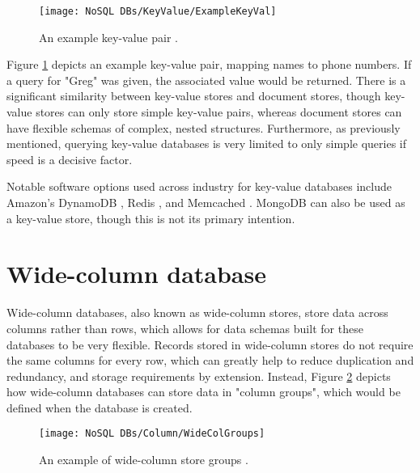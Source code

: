 
\begin{figure}[H]
    \centering
    \texttt{[image: NoSQL DBs/KeyValue/ExampleKeyVal]}
    \caption{An example key-value pair \autocite{redisWhatKeyValueDatabase}.\label{fig:ExampleKeyVal}}
\end{figure}


\noindent Figure \ref{fig:ExampleKeyVal} depicts an example key-value pair, mapping names to phone numbers. If a query for "Greg" was given, 
the associated value would be returned. There is a significant similarity between key-value stores and document stores, though key-value stores
can only store simple key-value pairs, whereas document stores can have flexible schemas of complex, nested structures. Furthermore, as previously 
mentioned, querying key-value databases is very limited to only simple queries if speed is a decisive factor. 

\para Notable software options used across industry for key-value databases include Amazon's DynamoDB \autocite{awsFastNoSQLKeyValue}, Redis \autocite{redisWhatKeyValueDatabase}, and Memcached \autocite{memcachedMemcachedDistributedMemory}. MongoDB can also be used as a key-value store, though this is
not its primary intention.


\section{Wide-column database}

Wide-column databases, also known as wide-column stores, store data across columns rather than rows, which allows for data schemas built for these 
databases to be very flexible. Records stored in wide-column stores do not require the same columns for every row, which can greatly help to reduce 
duplication and redundancy, and storage requirements by extension. Instead, Figure \ref{fig:ExampleWideCol} depicts how wide-column databases can store 
data in "column groups", which would be defined when the database is created.

\begin{figure}[H]
    \centering
    \texttt{[image: NoSQL DBs/Column/WideColGroups]}
    \caption{An example of wide-column store groups \autocite{poreNoSQLDataArchitecture2018}.\label{fig:ExampleWideCol}}
\end{figure}

